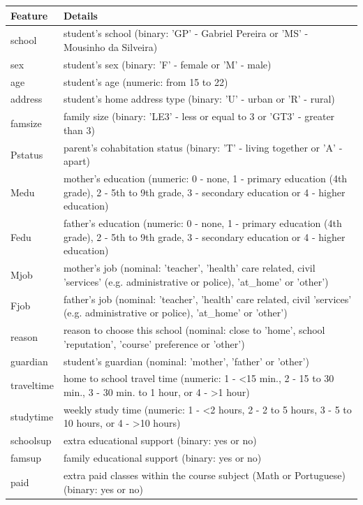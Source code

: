 \documentclass[11pt,a4paper]{article}
\begin{document}
\begin{table}[H]
\centering
\begin{tabular}{|p{2cm}|p{13cm}|}
\hline
Feature & Details \\ \hline
school & student's school (binary: 'GP' - Gabriel Pereira or 'MS' - Mousinho da Silveira) \\ \hline
sex & student's sex (binary: 'F' - female or 'M' - male)  \\ \hline
age & student's age (numeric: from 15 to 22)\\ \hline
address & student's home address type (binary: 'U' - urban or 'R' - rural)\\ \hline
famsize & family size (binary: 'LE3' - less or equal to 3 or 'GT3' - greater than 3) \\ \hline
Pstatus & parent's cohabitation status (binary: 'T' - living together or 'A' - apart)\\ \hline
Medu & mother's education (numeric: 0 - none, 1 - primary education (4th grade), 2 - 5th to 9th grade, 3 - secondary education or 4 - higher education)\\ \hline
Fedu & father's education (numeric: 0 - none, 1 - primary education (4th grade), 2 - 5th to 9th grade, 3 - secondary education or 4 - higher education) \\ \hline
Mjob & mother's job (nominal: 'teacher', 'health' care related, civil 'services' (e.g. administrative or police), 'at\_home' or 'other') \\ \hline
Fjob & father's job (nominal: 'teacher', 'health' care related, civil 'services' (e.g. administrative or police), 'at\_home' or 'other') \\ \hline
reason & reason to choose this school (nominal: close to 'home', school 'reputation', 'course' preference or 'other') \\ \hline
guardian &  student's guardian (nominal: 'mother', 'father' or 'other') \\ \hline
traveltime & home to school travel time (numeric: 1 - <15 min., 2 - 15 to 30 min., 3 - 30 min. to 1 hour, or 4 - >1 hour) \\ \hline
studytime &  weekly study time (numeric: 1 - <2 hours, 2 - 2 to 5 hours, 3 - 5 to 10 hours, or 4 - >10 hours) \\ \hline
schoolsup & extra educational support (binary: yes or no) \\ \hline
famsup & family educational support (binary: yes or no) \\ \hline
paid & extra paid classes within the course subject (Math or Portuguese) (binary: yes or no) \\ \hline

\end{tabular}
\end{table}
\end{document}
